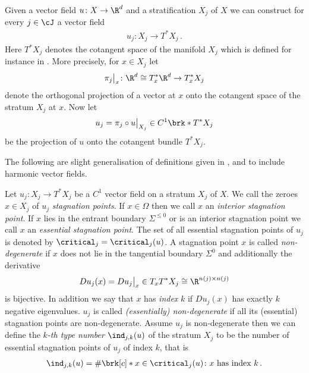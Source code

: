 Given a vector field $u\colon X\to\R^d$ and a stratification $X_j$ of $X$ we can construct for every
$j\in\cJ$ a vector field
\begin{align*}
  u_j\colon X_j\to T^*X_j\,.
\end{align*}
Here $T^*X_j$ denotes the cotangent space of the manifold $X_j$ which is defined for instance in \cite[Chapter 6]{Hirsch1994}.
More precisely, for $x\in X_j$ let
\begin{align}
  \pi_j\big\vert_x\colon\R^d\cong T_x^*\R^d\to T_x^*X_{j}\label{eq:def_projectionStratification}
\end{align}
denote the orthogonal projection of a vector at $x$ onto the cotangent space of the stratum $X_j$ at $x$.
Now let
\begin{align}
  u_j=\pi_j\circ u\big\vert_{X_j}\in C^1\brk*{T^*X_j}\label{eq:def_projectionUStratification}
\end{align}
be the projection of $u$ onto the cotangent bundle $T^*X_j$.

The following are slight generalisation of definitions given in \cite[p.138f]{Shelton1980}, \cite[§5]{Morse1969} and \cite[p.282f]{Morse1970}
to include harmonic vector fields.
\begin{definition}\label{df:nonDegeneracy}
  Let $u_j\colon X_j\to T^*X_j$ be a $C^1$ vector field on a stratum $X_j$ of $X$.
  We call the zeroes $x\in X_j$ of $u_j$ \emph{stagnation points}.
  If $x\in\Omega$ then we call $x$ an \emph{interior stagnation point}.
  If $x$ lies in the entrant boundary $\Sigma^{\leq0}$ or is an interior stagnation point we call $x$ an \emph{essential stagnation point}.
  The set of all essential stagnation points of $u_j$ is denoted by $\critical_j=\critical_j(u)$.
  A stagnation point $x$ is called
  \emph{non-degenerate} if $x$ does not lie in the tangential boundary $\Sigma^0$ 
  and additionally the derivative
  \begin{align*}
    Du_j(x)=Du_j\big\vert_x\in T_xT^*X_j\cong \R^{n(j)\times n(j)}
  \end{align*}
  is bijective.
  In addition we say that $x$ has \emph{index} $k$
  if $Du_j(x)$ has exactly $k$ negative eigenvalues.
  $u_j$ is called \emph{(essentially) non-degenerate} if all its (essential) stagnation points
  are non-degenerate. 
  Assume $u_j$ is non-degenerate then we can define the \emph{$k$-th type number} $\ind_{j,k}(u)$ of the
  stratum $X_j$ to be the number of essential stagnation points of $u_j$ of index $k$,
  that is
  \begin{align}
    \ind_{j,k}(u)=\#\brk[c]*{x\in\critical_j(u)\colon x\text{ has index }k}\,.\label{eq:def_typenbr_strata}
  \end{align}
\end{definition}

